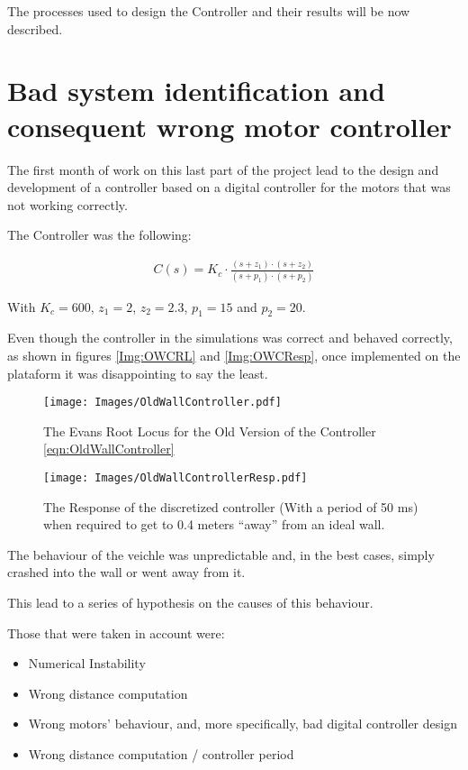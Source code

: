 The processes used to design the Controller and their results will be now
described.

\section{Bad system identification and consequent wrong motor controller}

  The first month of work on this last part of the project lead to the
  design and development of a controller based on a digital controller for
  the motors that was not working correctly.

  The Controller was the following:

  \begin{align}\label{eqn:OldWallController}
    C(s) = K_c \cdot{} \frac{(s + z_1) \cdot{} (s + z_2)}{(s + p_1) \cdot{} (s + p_2)}
  \end{align}

  With $K_c = 600$, $z_1 = 2$, $z_2 = 2.3$, $p_1 = 15$ and $p_2 = 20$. 

  Even though the controller in the simulations was correct and behaved
  correctly, as shown in figures \ref{Img:OWCRL} and \ref{Img:OWCResp},
  once implemented on the plataform it was disappointing to say the least.

  \begin{figure}[h!]
    \centering
    \texttt{[image: Images/OldWallController.pdf]}
    \caption{The Evans Root Locus for the Old Version of the Controller
    \ref{eqn:OldWallController}\label{img:OWCRL}}
  \end{figure}

  \begin{figure}[h!]
    \centering
    \texttt{[image: Images/OldWallControllerResp.pdf]}
    \caption{The Response of the discretized controller (With a period of
      50 ms) when required to get to 0.4
      meters ``away'' from an ideal wall.\label{img:OWCResp}}
  \end{figure}


  The behaviour of the veichle was unpredictable and, in the best cases,
  simply crashed into the wall or went away from it.

  This lead to a series of hypothesis on the causes of this behaviour.

  Those that were taken in account were:

  \begin{itemize}
    \item{} Numerical Instability
    \item{} Wrong distance computation
    \item{} Wrong motors' behaviour, and, more specifically, bad digital
      controller design
    \item{} Wrong distance computation / controller period
  \end{itemize}

